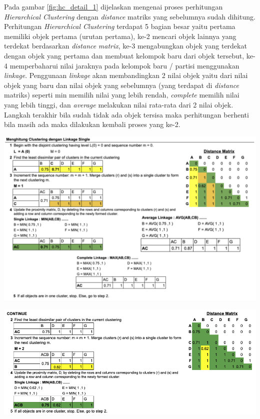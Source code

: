 Pada gambar \ref{fig:hc_detail_1} dijelaskan mengenai proses perhitungan \textit{Hierarchical Clustering} dengan \textit{distance} matriks yang sebelumnya sudah dihitung. Perhitungan \textit{Hierarchical Clustering} terdapat 5 bagian besar yaitu pertama memiliki objek pertama (urutan pertama), ke-2 mencari objek lainnya yang terdekat berdasarkan \textit{distance} \textit{matrix}, ke-3 mengabungkan objek yang terdekat dengan objek yang pertama dan membuat kelompok baru dari objek tersebut, ke-4 memperbaharui nilai jaraknya pada kelompok baru / partisi menggunakan \textit{linkage}. Penggunaan \textit{linkage} akan membandingkan 2 nilai objek yaitu dari nilai objek yang baru dan nilai objek yang sebelumnya (yang terdapat di \textit{distance} matriks) seperti min memilih nilai yang lebih rendah, \textit{complete} memilih nilai yang lebih tinggi, dan \textit{average} melakukan nilai rata-rata dari 2 nilai objek. Langkah terakhir bila sudah tidak ada objek tersisa maka perhitungan berhenti bila masih ada maka dilakukan kembali proses yang ke-2.

\begin{center}
	\includegraphics[width=14cm]{img/bab_3/hc_detail_1.png}
	\label{fig:hc_detail_1}
\end{center}

\begin{center}
	\includegraphics[width=14cm]{img/bab_3/hc_detail_2.png}
	\label{fig:hc_detail_2}
\end{center}

